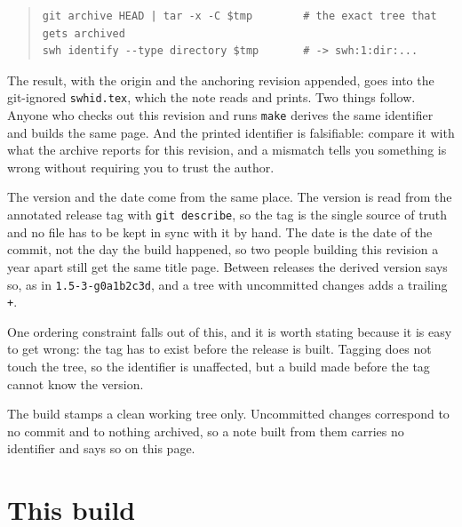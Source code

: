 \begin{quote}\footnotesize
\begin{verbatim}
git archive HEAD | tar -x -C $tmp        # the exact tree that gets archived
swh identify --type directory $tmp       # -> swh:1:dir:...
\end{verbatim}
\end{quote}

\noindent The result, with the origin and the anchoring revision appended, goes into the
git-ignored \texttt{swhid.tex}, which the note reads and prints. Two things follow. Anyone who
checks out this revision and runs \texttt{make} derives the same identifier and builds the same
page. And the printed identifier is falsifiable: compare it with what the archive reports for
this revision, and a mismatch tells you something is wrong without requiring you to trust the
author.

The version and the date come from the same place. The version is read from the annotated release
tag with \texttt{git describe}, so the tag is the single source of truth and no file has to be
kept in sync with it by hand. The date is the date of the commit, not the day the build happened,
so two people building this revision a year apart still get the same title page. Between releases
the derived version says so, as in \texttt{1.5-3-g0a1b2c3d}, and a tree with uncommitted changes
adds a trailing \texttt{+}.

One ordering constraint falls out of this, and it is worth stating because it is easy to get
wrong: the tag has to exist before the release is built. Tagging does not touch the tree, so the
identifier is unaffected, but a build made before the tag cannot know the version.

The build stamps a clean working tree only. Uncommitted changes correspond to no commit and to
nothing archived, so a note built from them carries no identifier and says so on this page.

\section{This build}

